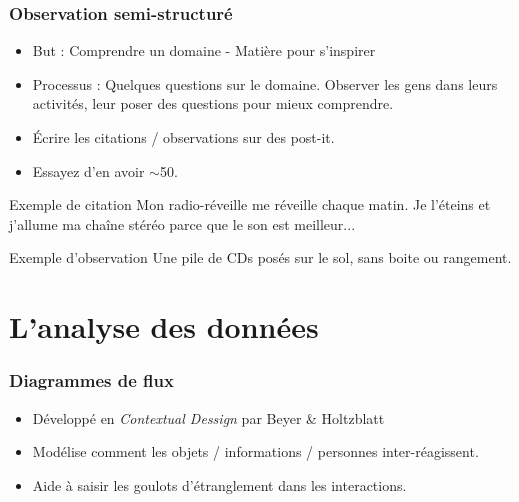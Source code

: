 \documentclass{beamer}
\begin{document}
\begin{frame}
\frametitle{Observation semi-structuré}
\begin{itemize}
	\item But : Comprendre un domaine - Matière pour s'inspirer
	\item Processus : Quelques questions sur le domaine. Observer les gens dans leurs activités, leur poser des questions pour mieux comprendre.
	\item Écrire les citations / observations sur des post-it.
	\item Essayez d'en avoir $\sim$50.
\end{itemize}

\pause

\begin{exampleblock}{Exemple de citation}
Mon radio-réveille me réveille chaque matin. Je l’éteins et j'allume ma chaîne stéréo parce que le son est meilleur...
\end{exampleblock}

\begin{exampleblock}{Exemple d'observation}
Une pile de CDs posés sur le sol, sans boite ou rangement.
\end{exampleblock}

\end{frame}

\section{L'analyse des données}

\begin{frame}
\frametitle{Diagrammes de flux}
\begin{itemize}
	\item Développé en \emph{Contextual Dessign} par Beyer \& Holtzblatt
	\item Modélise comment les objets / informations / personnes inter-réagissent.
	\item Aide à saisir les goulots d'étranglement dans les interactions.
\end{itemize}
\end{frame}
\end{document}
